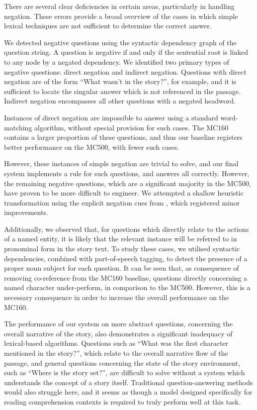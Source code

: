 \documentclass[11pt]{article}
\begin{document}
There are several clear deficiencies in certain areas, particularly in handling negation. These errors provide a broad overview of the cases in which simple lexical techniques are not sufficient to determine the correct answer.

We detected negative questions using the syntactic dependency graph of the question string. A question is negative if and only if the sentential root is linked to any node by a negated dependency. We identified two primary types of negative questions: direct negation and indirect negation. Questions with direct negation are of the form ``What wasn't in the story?'', for example, and it is sufficient to locate the singular answer which is not referenced in the passage. Indirect negation encompasses all other questions with a negated headword.

Instances of direct negation are impossible to answer using a standard word-matching algorithm, without special provision for such cases. The MC160 contains a larger proportion of these questions, and thus our baseline registers better performance on the MC500, with fewer such cases.

However, these instances of simple negation are trivial to solve, and our final system implements a rule for such questions, and answers all correctly. However, the remaining negative questions, which are a significant majority in the MC500, have proven to be more difficult to engineer. We attempted a shallow heuristic transformation using the explicit negation cues from , which registered minor improvements.

Additionally, we observed that, for questions which directly relate to the actions of a named entity, it is likely that the relevant instance will be referred to in pronominal form in the story text. To study these cases, we utilised syntactic dependencies, combined with part-of-speech tagging, to detect the presence of a proper noun subject for each question. It can be seen that, as consequence of removing co-reference from the MC160 baseline, questions directly concerning a named character under-perform, in comparison to the MC500. However, this is a necessary consequence in order to increase the overall performance on the MC160.

The performance of our system on more abstract questions, concerning the overall narrative of the story, also demonstrates a significant inadequacy of lexical-based algorithms. Questions such as ``What was the first character mentioned in the story?'', which relate to the overall narrative flow of the passage, and general questions concerning the state of the story environment, such as ``Where is the story set?'', are difficult to solve without a system which understands the concept of a story itself. Traditional question-answering methods would also struggle here, and it seems as though a model designed specifically for reading comprehension contexts is required to truly perform well at this task.
\end{document}
